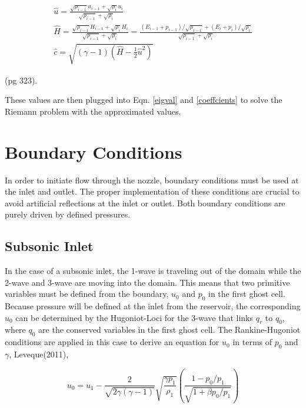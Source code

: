 \documentclass[11pt]{article}%
\numberwithin{equation}{section}
\begin{document}
\begin{equation}
\begin{split}
\hat{u}= \frac{\sqrt{\rho_{i - 1}} u_{i-1} + \sqrt{\rho_i} u_i}{\sqrt{\rho_{i-1}} + \sqrt{\rho_i}}  \\
\hat{H} = \frac{\sqrt{\rho_{i - 1}} H_{i-1} + \sqrt{\rho_i} H_i}{\sqrt{\rho_{i-1}} + \sqrt{\rho_i}} = \frac{(E_{i-1} + p_{i-1})/\sqrt{\rho_{i - 1}}+ (E_i + p_i) / \sqrt{\rho_i} }{\sqrt{\rho_{i-1}} + \sqrt{\rho_i}} \\
\hat{c} = \sqrt{(\gamma - 1) \left( \hat{H} - \frac{1}{2} \hat{u}^2 \right)}
\end{split}
\end{equation}

(pg 323).

These values are then plugged into Eqn. \ref{eigval} and \ref{coeffcients} to solve the Riemann problem with the approximated values.

\section{Boundary Conditions}
In order to initiate flow through the nozzle, boundary conditions must be used at the inlet and outlet. The proper implementation of these conditions are crucial to avoid artificial reflections at the inlet or outlet. Both boundary conditions are purely driven by defined pressures.

\subsection{Subsonic Inlet}
In the case of a subsonic inlet, the 1-wave is traveling out of the domain while the 2-wave and 3-wave are moving into the domain. This means that two primitive variables must be defined from the boundary, $u_0$ and $p_0$ in the first ghost cell. Because pressure will be defined at the inlet from the reservoir, the corresponding $u_0$ can be determined by the Hugoniot-Loci for the 3-wave that links $q_r$ to $q_0$, where $q_0$ are the conserved variables in the first ghost cell. The Rankine-Hugoniot conditions are applied in this case to derive an equation for $u_0$ in terms of $p_0$ and $\gamma$, Leveque(2011),

\begin{equation}
u_0 = u_1 - \frac{2}{\sqrt{2 \gamma (\gamma - 1)}} \sqrt{\frac{\gamma p_1}{\rho_1}} \left( \frac{1 - p_0 / p_1}{\sqrt{1 + \beta p_0 / p_1}} \right)
\end{equation}
\end{document}
